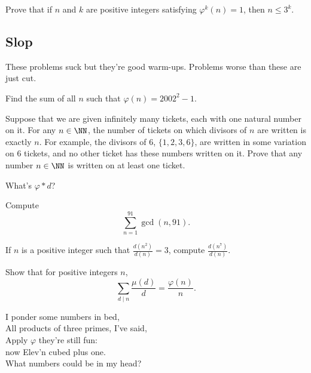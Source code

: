 \documentclass[11pt]{scrartcl}
\begin{document}
\begin{problem}[TSTST 2016/4]
	Prove that if $n$ and $k$ are positive integers satisfying $\varphi^k(n) = 1$, then $n \le 3^k$.
\end{problem}

\subsection{Slop}

These problems suck but they're good warm-ups. Problems worse than these are just cut.

\begin{problem} %
    Find the sum of all $n$ such that $\varphi(n) = 2002^2 - 1$.
\end{problem}

\begin{problem}
	\label{pro:berkeley}
	Suppose that we are given infinitely many tickets, each with one natural number on it. For any $n \in \NN$, the number of tickets on which divisors of $n$ are written is exactly $n$. For example, the divisors of $6$, $\{1, 2, 3, 6\}$, are written in some variation on $6$ tickets, and no other ticket has these numbers written on it. Prove that any number $n \in \NN$ is written on at least one ticket.
\end{problem}

\begin{problem} %
    What's $\varphi \ast d$?
\end{problem}

\begin{problem} %
    Compute
    \[\sum_{n=1}^{91} \gcd(n, 91).\]
\end{problem}

\begin{problem} %
    If $n$ is a positive integer such that $\frac{d(n^2)}{d(n)} = 3$, compute $\frac{d(n^7)}{d(n)}$.
\end{problem}

\begin{problem} %
    Show that for positive integers $n$,
    \[
        \sum_{d \mid n} \frac{\mu(d)}{d} = \frac{\varphi(n)}{n}.
    \]
\end{problem}

\begin{problem} %
    I ponder some numbers in bed,\\
    All products of three primes, I've said,\\
    Apply $\varphi$ they're still fun:\\
    now Elev'n cubed plus one.\\
    What numbers could be in my head?
\end{problem}
\end{document}
